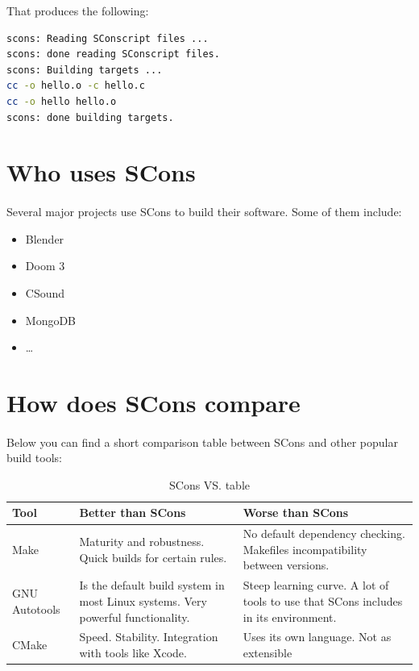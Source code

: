 \documentclass[a4paper,11pt]{report}
\begin{document}
That produces the following:

\begin{lstlisting}[language=bash, columns=fullflexible]
% scons
scons: Reading SConscript files ...
scons: done reading SConscript files.
scons: Building targets ...
cc -o hello.o -c hello.c
cc -o hello hello.o
scons: done building targets.
\end{lstlisting}

\section{Who uses SCons}

\paragraph{}


Several major projects use SCons to build their software. Some of them include:

\begin{itemize}
\item{Blender}
\item{Doom 3}
\item{CSound}
\item{MongoDB}
\item{\ldots}
\end{itemize}
\newpage
\section{How does SCons compare}

\paragraph{}

Below you can find a short comparison table between SCons and other popular build tools:

\begin{table}[h]
\centering
 \begin{tabular}{| l | p{6 cm} | p{6 cm} |}
 \hline \textbf{Tool} & \textbf{Better than SCons} & \textbf{Worse than SCons} \\
 \hline 
 Make & Maturity and robustness. Quick builds for certain rules. & No default dependency checking. Makefiles incompatibility between versions.\\
 \hline 
 GNU Autotools& Is the default build system in most Linux systems. Very powerful functionality. & Steep learning curve. A lot of tools to use that SCons includes in its environment. \\ 
 \hline 
 CMake & Speed. Stability. Integration with tools like Xcode. & Uses its own language. Not as extensible\\ 
 \hline 
 \end{tabular} 
 \caption[SCons VS. table]{SCons VS. table}
\end{table}
\end{document}
